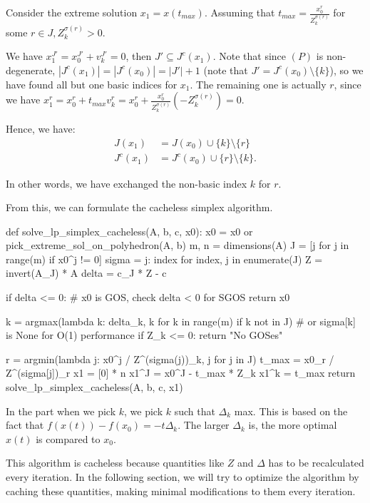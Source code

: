 Consider the extreme solution \( x_{1} = x(t_{max}) \). Assuming that \( t_{max} =
\frac{x^{r}_{0}}{Z^{\sigma(r)}_{k}} \) for some \( r \in J, Z^{\sigma(r)}_{k} > 0 \).

We have \( x_{1}^{J'} = x_{0}^{J'} + v_{k}^{J'} = 0 \), then \( J' \subseteq
J^{c}(x_{1}) \). Note that since \( (P) \) is non-degenerate, \( |J^{c}(x_{1})|
= |J^{c}(x_{0})| = |J'| + 1\) (note that \( J' = J^{c}(x_{0}) \setminus \{k\}
\)), so we have found all but one basic indices for \( x_{1} \). The remaining
one is actually \( r \), since we have \( x_{1}^{r} = x_{0}^{r} +
t_{max}v^{r}_{k} = x_{0}^{r} + \frac{x^{r}_{0}}{Z^{\sigma(r)}_{k}}\left(
  -Z^{\sigma(r)}_{k}
\right) = 0 \).

Hence, we have:
\begin{align*}
  J(x_{1}) &= J(x_{0}) \cup  \{k\} \setminus \{r\}   \\
  J^{c}(x_{1}) &= J^{c}(x_{0})  \cup \{r\} \setminus \{k\}   
.\end{align*}

In other words, we have exchanged the non-basic index \( k \) for \( r \).

From this, we can formulate the cacheless simplex algorithm.

\begin{python}
def solve_lp_simplex_cacheless(A, b, c, x0):
  x0 = x0 or pick_extreme_sol_on_polyhedron(A, b)
  m, n = dimensions(A)
  J = [j for j in range(m) if x0^j != 0]
  sigma = {j: index for index, j in enumerate(J)}
  Z = invert(A_J) * A
  delta = c_J * Z - c

  if delta <= 0:
    # x0 is GOS, check delta < 0 for SGOS
    return x0

  k = argmax(lambda k: delta_k,
             k for k in range(m) if k not in J)
             # or sigma[k] is None for O(1) performance
  if Z_k <= 0:
    return "No GOSes"

  r = argmin(lambda j: x0^j / Z^(sigma(j))_k,
             j for j in J)
  t_max = x0_r / Z^(sigma[j])_r
  x1 = [0] * n
  x1^J = x0^J - t_max * Z_k
  x1^k = t_max
  return solve_lp_simplex_cacheless(A, b, c, x1)
\end{python}

In the part when we pick \( k \), we pick \( k \) such that \( \Delta_{k} \)
max. This is based on the fact that \( f(x(t)) - f(x_{0}) = -t\Delta_{k} \). The
larger \( \Delta_{k} \) is, the more optimal \( x(t) \) is compared to \( x_{0} \).

This algorithm is cacheless because quantities like \( Z \) and \(
\Delta \) has to be recalculated every iteration. In the following section, we
will try to optimize the algorithm by caching these quantities, making minimal
modifications to them every iteration.


